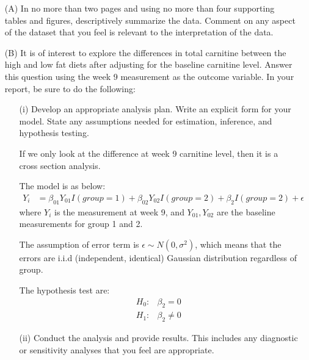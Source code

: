 							\begin{itemize}
							  \vspace{0.2cm} 
								\item[(A)] In no more than two pages and using no more than four supporting tables and figures, descriptively 
													 summarize the data. Comment on any aspect of the dataset that you
													 feel is relevant to the interpretation of the data. \vspace{0.2cm}

								\vspace{0.2cm}
								\item[(B)] It is of interest to explore the differences in total carnitine between the high and low
													 fat diets after adjusting for the baseline carnitine level. Answer this question using
													 the week 9 measurement as the outcome variable. In your report, be sure to do the following:
													 
												\begin{itemize}
													\vspace{0.2cm}
													\item[(i)] Develop an appropriate analysis plan. Write an explicit form for your model.
																		 State any assumptions needed for estimation, inference, and hypothesis testing.

If we only look at the difference at week 9 carnitine level, then it is a cross section analysis. 

The model is as below:
\begin{align*}
Y_{i} &=  \beta_{01} Y_{01} I(group = 1) + \beta_{02}Y_{02} I(group = 2) +  \beta_2 I(group= 2) + \epsilon
\end{align*}
where $Y_{i}$ is the measurement at week 9, and $Y_{01}, Y_{02}$ are the baseline measurements for group 1 and 2.

The assumption of error term is $\epsilon \sim N(0, \sigma^2)$, which means that the errors are i.i.d (independent, identical) Gaussian distribution regardless of group. 

The hypothesis test are:
\begin{align*}
H_0: & \beta_2 = 0 \\
H_1: & \beta_2 \neq 0
\end{align*}

													\vspace{0.2cm}
												  \item[(ii)] Conduct the analysis and provide results.	This includes any diagnostic or sensitivity analyses
																			that you feel are appropriate.


\end{itemize}
\end{itemize}
